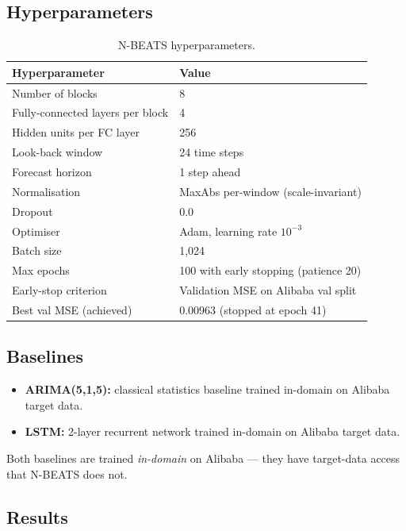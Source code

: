 \documentclass[12pt,a4paper]{article}
\begin{document}
\subsection{Hyperparameters}

\begin{table}[H]
\centering
\small
\caption{N-BEATS hyperparameters.}
\begin{tabular}{@{}ll@{}}
\toprule
\textbf{Hyperparameter} & \textbf{Value} \\
\midrule
Number of blocks & 8 \\
Fully-connected layers per block & 4 \\
Hidden units per FC layer & 256 \\
Look-back window & 24 time steps \\
Forecast horizon & 1 step ahead \\
Normalisation & MaxAbs per-window (scale-invariant) \\
Dropout & 0.0 \\
Optimiser & Adam, learning rate $10^{-3}$ \\
Batch size & 1,024 \\
Max epochs & 100 with early stopping (patience 20) \\
Early-stop criterion & Validation MSE on Alibaba val split \\
Best val MSE (achieved) & 0.00963 (stopped at epoch 41) \\
\bottomrule
\end{tabular}
\end{table}

\subsection{Baselines}

\begin{itemize}
  \item \textbf{ARIMA(5,1,5):} classical statistics baseline trained in-domain on Alibaba target data.
  \item \textbf{LSTM:} 2-layer recurrent network trained in-domain on Alibaba target data.
\end{itemize}
Both baselines are trained \emph{in-domain} on Alibaba --- they have target-data access that N-BEATS does not.

\subsection{Results}
\end{document}
